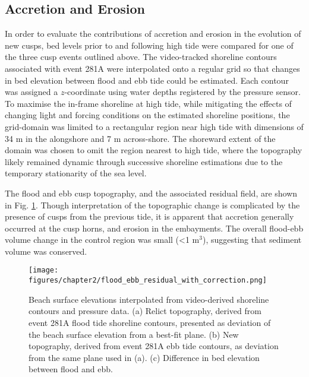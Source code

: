 \subsection{Accretion and Erosion} 

In order to evaluate the contributions of accretion and erosion in the evolution of new cusps, bed levels prior to and following high tide were compared for one of the three cusp events outlined above. The video-tracked shoreline contours associated with event 281A were interpolated onto a regular grid so that changes in bed elevation between flood and ebb tide could be estimated. Each contour was assigned a $z$-coordinate using water depths registered by the pressure sensor. To maximise the in-frame shoreline at high tide, while mitigating the effects of changing light and forcing conditions on the estimated shoreline positions, the grid-domain was limited to a rectangular region near high tide with dimensions of 34 m in the alongshore and 7 m across-shore. The shoreward extent of the domain was chosen to omit the region nearest to high tide, where the topography likely remained dynamic through successive shoreline estimations due to the temporary stationarity of the sea level.%

The flood and ebb cusp topography, and the associated residual field, are shown in Fig. \ref{fig:flood_ebb_residual}. Though interpretation of the topographic change is complicated by the presence of cusps from the previous tide, it is apparent that accretion generally occurred at the cusp horns, and erosion in the embayments. The overall flood-ebb volume change in the control region was small (\textless 1 m$^{3}$), suggesting that sediment volume was conserved.

\begin{figure}[tbp] %
  	\texttt{[image: figures/chapter2/flood\_ebb\_residual\_with\_correction.png]}
 	\caption[Beach surface elevation plots]{Beach surface elevations interpolated from video-derived shoreline contours and pressure data. (a) Relict topography, derived from event 281A flood tide shoreline contours, presented as deviation of the beach surface elevation from a best-fit plane. (b) New topography, derived from event 281A ebb tide contours, as deviation from the same plane used in (a). (c) Difference in bed elevation between flood and ebb.}
 	\label{fig:flood_ebb_residual}
\end{figure}

